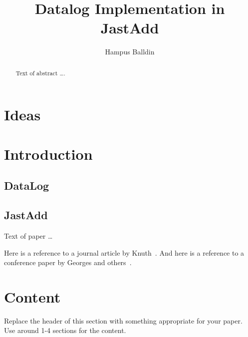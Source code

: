 \documentclass[sigplan,10pt]{acmart}
\begin{document}
\title[Short Title]{Datalog Implementation in JastAdd}         %



\author{Hampus Balldin}


\begin{abstract}
Text of abstract \ldots.
\end{abstract}


\maketitle

\section{Ideas}

\section{Introduction}
\subsection{DataLog}
\subsection{JastAdd}

Text of paper \ldots

Here is a reference to a journal article by Knuth~\cite{Knuth68}. And here is a reference to a conference paper by Georges and others~\cite{GeorgesBE07}.

\lipsum[1-3] %

\section{Content}
Replace the header of this section with something appropriate for your paper. Use around 1-4 sections for the content.

\lipsum[4-10] %
\end{document}
